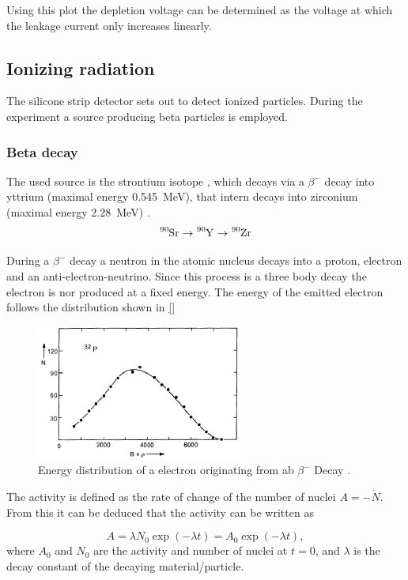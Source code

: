 Using this plot the depletion voltage can be determined as the voltage at which the leakage current only increases linearly.

\subsection{Ionizing radiation}
The silicone strip detector sets out to detect ionized particles. During the experiment a source producing beta particles is employed.
\subsubsection{Beta decay}
The used source is the strontium isotope , which decays via a $\beta^-$ decay into yttrium (maximal energy \qty{0.545}{\mega\eV}), that intern decays into zirconium (maximal energy \qty{2.28}{\mega\eV}) \cite{V15}.
\begin{equation}
	\ce{^{90}Sr} \rightarrow \ce{^{90}Y} \rightarrow \ce{^{90}Zr}
\end{equation}

During a $\beta^-$ decay a neutron in the atomic nucleus decays into a proton, electron and an anti-electron-neutrino. Since this process is a three body decay the electron is nor produced at a fixed energy. The energy of the emitted electron follows the distribution shown in \autoref{}


\begin{figure}
	\centering
	\includegraphics[width=0.7\linewidth]{Assets/edist.png}
	\caption{Energy distribution of a electron originating from ab $\beta^-$ Decay \cite{V15}.}
	\label{fig:edist}
\end{figure}

The activity is defined as the rate of change of the number of nuclei $A = - \dot{N}$. From this it can be deduced that the activity can be written as

\begin{equation}
	A = \lambda N_0 \exp(-\lambda t) = A_0 \exp(-\lambda t),
\end{equation}
where $A_0$ and $N_0$ are the activity and number of nuclei at $t=0$, and $\lambda$ is the decay constant of the decaying material/particle.

